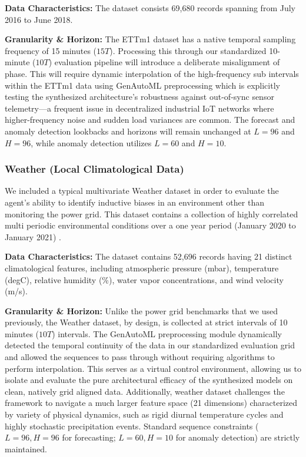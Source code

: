 \documentclass{article}
\begin{document}
\textbf{Data Characteristics:} The dataset consists 69,680 records spanning from July 2016 to June 2018.

\textbf{Granularity \& Horizon:} The ETTm1 dataset has a native temporal sampling frequency of 15 minutes ($15T$). Processing this through our standardized 10-minute ($10T$) evaluation pipeline will introduce a deliberate misalignment of phase. This will require dynamic interpolation of the high-frequency sub intervals within the ETTm1 data using GenAutoML preprocessing which is explicitly testing the synthesized architecture's robustness against out-of-sync sensor telemetry—a frequent issue in decentralized industrial IoT networks where higher-frequency noise and sudden load variances are common. The forecast and anomaly detection lookbacks and horizons will remain unchanged at $L=96$ and $H=96$, while anomaly detection utilizes $L=60$ and $H=10$.


\subsubsection{Weather (Local Climatological Data)}
We included a typical multivariate Weather dataset in order to evaluate the agent’s ability to identify inductive biases in an environment other than monitoring the power grid. This dataset contains a collection of highly correlated multi periodic environmental conditions over a one year period (January 2020 to January 2021) \cite{wu2021autoformer}.



\textbf{Data Characteristics:} The dataset contains 52,696 records having 21 distinct climatological features, including atmospheric pressure (mbar), temperature (degC), relative humidity (\%), water vapor concentrations, and wind velocity (m/s).

\textbf{Granularity \& Horizon:} Unlike the power grid benchmarks that we used previously, the Weather dataset, by design, is collected at strict intervals of 10 minutes ($10T$) intervals. The GenAutoML preprocessing module dynamically detected the temporal continuity of the data in our standardized evaluation grid and allowed the sequences to pass through without requiring algorithms to perform interpolation. This serves as a virtual control environment, allowing us to isolate and evaluate the pure architectural efficacy of the synthesized models on clean, natively grid aligned data. Additionally, weather dataset challenges the framework to navigate a much larger feature space (21 dimensions) characterized by variety of physical dynamics, such as rigid diurnal temperature cycles and highly stochastic precipitation events. Standard sequence constraints ($L=96, H=96$ for forecasting; $L=60, H=10$ for anomaly detection) are strictly maintained.
\end{document}
